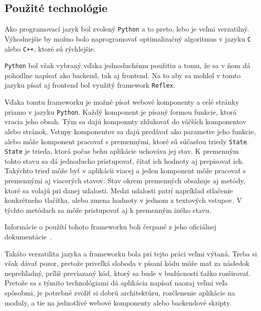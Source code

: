 \subsection*{Použité technológie}
Ako programovací jazyk bol zvolený \texttt{Python} a to preto, lebo je veľmi verzatilný.
Výhodnejšie by možno bolo naprogramovať optimalizačný algoritmus v jazyku \texttt{C} alebo \texttt{C++}, ktoré sú rýchlejšie.

\texttt{Python} bol však vybraný vďaka jednoduchému použitiu a tomu, že sa v ňom dá pohodlne napísať ako backend, tak aj frontend.
Na to aby sa mohlol v tomto jazyku písať aj frontend bol využitý framework \texttt{Reflex}.

Vďaka tomtu frameworku je možné písať webové komponenty a celé stránky priamo v jazyku \texttt{Python}.
Každý komponent je písaný formou funkcie, ktorá vracia jeho obsah.
Tým sa dajú komponnty zhlukovať do väčších komponentov alebo stránok.
Vstupy komponentov sa dajú predávať ako parametre jeho funkcie, alebo môže komponent pracovať s premennými, ktoré sú súčasťou triedy \texttt{State}.
\texttt{State} je trieda, ktorá počas behu aplikácie uchováva jej stav.
K premenným tohto stavu sa dá jednoducho pristupovať, čítať ich hodnoty aj prepisovať ich.
Takýchto tried môže byť v aplikácii viacej a jeden komponent môže pracovať s premennými aj viacerých stavov.
Stav okrem premenných obsahuje aj metódy, ktoré sa volajú pri danej udalosti.
Medzi udalosti patrí napríklad stlačenie konkrétneho tlačítka, alebo zmena hodnoty v jednom z textových vstupov.
V týchto metódach sa môže pristupovať aj k premenným iného stavu.               

Informácie o použítí tohoto frameworku boli čerpané z jeho oficiálnej dokumentácie~\cite{reflex_docs}.

Takáto verzatilita jazyka a frameworku bola pri tejto práci veľmi výtaná. 
Treba si však dávať pozor, pretože priveľká sloboda v písaní kódu môže mať za následok neprehľadný, príliš previazaný kód, ktorý sa bude v budúcnosti ťažko rozširovať.
Pretože sa s týmito technológiami dá aplikácia napísať naozaj veľmi veľa spôsobmi, je potrebné zvoliť si dobrú architektúru, rozčlenenie aplikácie na moduly, a tie na jednotlivé webové komponenty alebo backendové skripty.

